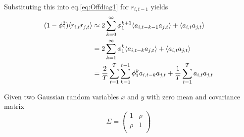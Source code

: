 \documentclass{book}
\begin{document}
Substituting this into eq.\ref{eq:Offdiag1} for $r_{i,t-1}$ yields
\begin{equation}
  \label{eq:Offdiag2}
  \begin{aligned}
  (1 - \phi_1^2)\langle r_{i,t} r_{j, t}\rangle &\approx
  2 \sum_{k=0}^\infty\phi_1^{k+1} \langle a_{i, t-k-1} a_{j, t}\rangle
  + \langle a_{i,t} a_{j,t}\rangle \\
  &=
  2 \sum_{k=1}^\infty\phi_1^k \langle a_{i, t-k} a_{j, t}\rangle
  + \langle a_{i,t} a_{j,t}\rangle \\
  &=
  {2 \over T} \sum_{t=1}^{T} \sum_{k=1}^{t-1}\phi_1^k a_{i, t-k} a_{j, t}
  + {1 \over T} \sum_{t=1}^{T} a_{i,t} a_{j,t}\\
  \end{aligned}
\end{equation}



Given two Gaussian random variables $x$ and $y$ with zero mean and
covariance matrix 
\begin{equation*}
  \Sigma =
  \begin{pmatrix}
    1 & \rho \\
    \rho & 1 \\
  \end{pmatrix}
\end{equation*}
\end{document}
